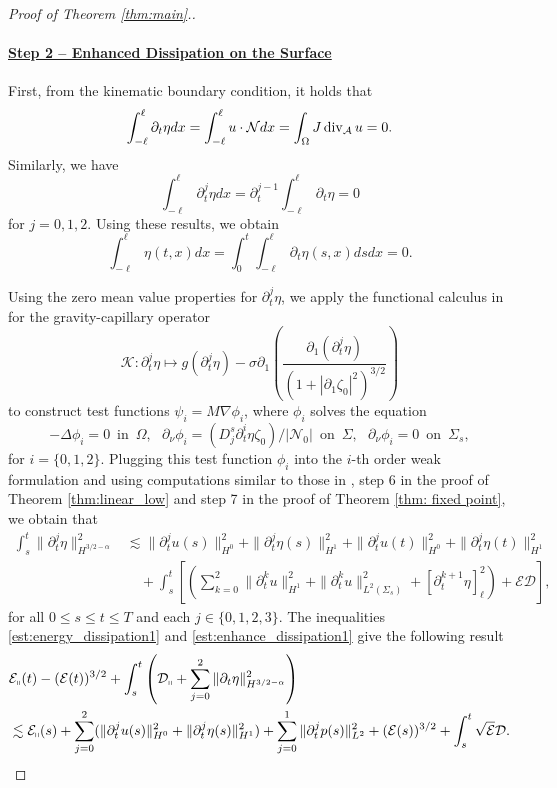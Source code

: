\documentclass[letterpaper,reqno,10pt,twoside]{amsart}
\theoremstyle{definition}
\theoremstyle{remark}
\def\p{\partial}
\def\dive{\mathop{\rm div}\nolimits}
\begin{document}
\begin{proof}[Proof of Theorem \ref{thm:main}.]
			\paragraph{\underline{Step 2 -- Enhanced Dissipation on the Surface}}
			
			First, from the kinematic boundary condition, it holds that
			\[
			\int_{-\ell}^{\ell}\p_{t}\eta dx=\int_{-\ell}^{\ell}u\cdot \mathcal{N}dx=\int_{\Omega}J\dive_{\mathcal{A}}u =0.
			\]
			Similarly, we have
			\[
			\int_{-\ell}^{\ell}\p_{t}^{j}\eta dx=\p_{t}^{j-1}\int_{-\ell}^{\ell}\p_{t}\eta=0
			\]
			for $j=0,1,2$. Using these results, we obtain
			\[
			\int_{-\ell}^{\ell}\eta(t,x)dx=\int_{0}^{t}\int_{-\ell}^{\ell}\p_{t}\eta(s,x)dsdx=0.
			\]
			
			Using the zero mean value properties for $\p_{t}^{j}\eta$, we apply
			the functional calculus in \cite[Section 8]{GT2020} for the gravity-capillary operator
			\[
			\mathcal{K}: \p_t^j\eta\mapsto g(\p_t^j\eta)-\sigma\p_1\left(\frac{\p_1(\p_t^j\eta)}{(1+|\p_1\zeta_0|^2)^{3/2}}\right)
			\]
			to construct test functions $\psi_{i}=M\nabla \phi_{i}$, where $\phi_{i}$ solves the equation
			\[
			-\Delta\phi_{i}=0~\operatorname{in}~\Omega,~~~\p_{\nu}\phi_{i}=(D_{j}^{s}\p_{t}^{i}{\eta}\zeta_{0})/|\mathcal{N}_{0}|~\operatorname{on}~\Sigma,~~~\p_{\nu}\phi_{i}=0~\operatorname{on}~\Sigma_{s},
			\]
			for $i=\{0,1,2\}$. Plugging this test function $\phi_{i}$ into the $i$-th order weak formulation and using computations similar to those in \cite{GT2020}, step 6 in the proof of Theorem \ref{thm:linear_low} and step 7 in the proof of Theorem  \ref{thm: fixed point}, we obtain that
			\begin{equation}\label{est:enhance_dissipation1}
				\begin{aligned}
					\int_s^t\|\p_t^j\eta\|_{H^{3/2-\alpha}}^2
					&\lesssim \|\p_t^ju(s)\|_{H^0}^2+\|\p_t^j\eta(s)\|_{H^1}^2+\|\p_t^ju(t)\|_{H^0}^2+\|\p_t^j\eta(t)\|_{H^1}^2\\
					&\quad+\int_s^t\left[(\sum_{k=0}^2\|\p_t^ku\|_{H^1}^2+\|\p_t^ku\|_{L^2(\Sigma_s)}^2+[\p_t^{k+1}\eta]_\ell^2)+\mathcal{E}\mathcal{D}\right],
				\end{aligned}
			\end{equation}
			for all $0\le s\le t\le T$ and each $j\in \{0, 1, 2,3\}$.
			The inequalities \eqref{est:energy_dissipation1} and \eqref{est:enhance_dissipation1} give the following result
			\begin{equation}\label{est:energy_dissipation2}
				\begin{aligned}
					&\mathcal{E}_\shortparallel(t)-(\mathcal{E}(t))^{3/2}+\int_s^t\left(\mathcal{D}_\shortparallel+\sum_{j=0}^2\|\p_t\eta\|_{H^{3/2-\alpha}}^2\right)\\
					&\lesssim\mathcal{E}_\shortparallel(s)+\sum_{j=0}^2(\|\p_t^ju(s)\|_{H^0}^2+\|\p_t^j\eta(s)\|_{H^1}^2)+\sum_{j=0}^{1}\|\p_{t}^{j}p(s)\|^{2}_{L^{2}}+(\mathcal{E}(s))^{3/2}+\int_s^t\sqrt{\mathcal{E}}\mathcal{D}.
				\end{aligned}
			\end{equation}
			

\end{proof}
\end{document}
